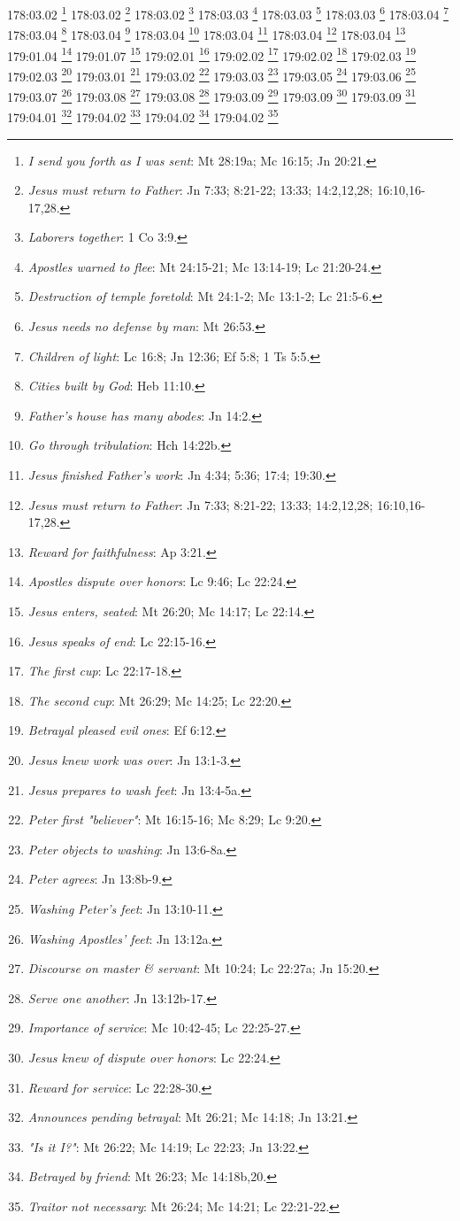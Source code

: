 178:03.02 \footnote{\textit{I send you forth as I was sent}: Mt 28:19a; Mc 16:15; Jn 20:21.}
178:03.02 \footnote{\textit{Jesus must return to Father}: Jn 7:33; 8:21-22; 13:33; 14:2,12,28; 16:10,16-17,28.}
178:03.02 \footnote{\textit{Laborers together}: 1 Co 3:9.}
178:03.03 \footnote{\textit{Apostles warned to flee}: Mt 24:15-21; Mc 13:14-19; Lc 21:20-24.}
178:03.03 \footnote{\textit{Destruction of temple foretold}: Mt 24:1-2; Mc 13:1-2; Lc 21:5-6.}
178:03.03 \footnote{\textit{Jesus needs no defense by man}: Mt 26:53.}
178:03.04 \footnote{\textit{Children of light}: Lc 16:8; Jn 12:36; Ef 5:8; 1 Ts 5:5.}
178:03.04 \footnote{\textit{Cities built by God}: Heb 11:10.}
178:03.04 \footnote{\textit{Father's house has many abodes}: Jn 14:2.}
178:03.04 \footnote{\textit{Go through tribulation}: Hch 14:22b.}
178:03.04 \footnote{\textit{Jesus finished Father's work}: Jn 4:34; 5:36; 17:4; 19:30.}
178:03.04 \footnote{\textit{Jesus must return to Father}: Jn 7:33; 8:21-22; 13:33; 14:2,12,28; 16:10,16-17,28.}
178:03.04 \footnote{\textit{Reward for faithfulness}: Ap 3:21.}
179:01.04 \footnote{\textit{Apostles dispute over honors}: Lc 9:46; Lc 22:24.}
179:01.07 \footnote{\textit{Jesus enters, seated}: Mt 26:20; Mc 14:17; Lc 22:14.}
179:02.01 \footnote{\textit{Jesus speaks of end}: Lc 22:15-16.}
179:02.02 \footnote{\textit{The first cup}: Lc 22:17-18.}
179:02.02 \footnote{\textit{The second cup}: Mt 26:29; Mc 14:25; Lc 22:20.}
179:02.03 \footnote{\textit{Betrayal pleased evil ones}: Ef 6:12.}
179:02.03 \footnote{\textit{Jesus knew work was over}: Jn 13:1-3.}
179:03.01 \footnote{\textit{Jesus prepares to wash feet}: Jn 13:4-5a.}
179:03.02 \footnote{\textit{Peter first "believer"}: Mt 16:15-16; Mc 8:29; Lc 9:20.}
179:03.03 \footnote{\textit{Peter objects to washing}: Jn 13:6-8a.}
179:03.05 \footnote{\textit{Peter agrees}: Jn 13:8b-9.}
179:03.06 \footnote{\textit{Washing Peter's feet}: Jn 13:10-11.}
179:03.07 \footnote{\textit{Washing Apostles' feet}: Jn 13:12a.}
179:03.08 \footnote{\textit{Discourse on master & servant}: Mt 10:24; Lc 22:27a; Jn 15:20.}
179:03.08 \footnote{\textit{Serve one another}: Jn 13:12b-17.}
179:03.09 \footnote{\textit{Importance of service}: Mc 10:42-45; Lc 22:25-27.}
179:03.09 \footnote{\textit{Jesus knew of dispute over honors}: Lc 22:24.}
179:03.09 \footnote{\textit{Reward for service}: Lc 22:28-30.}
179:04.01 \footnote{\textit{Announces pending betrayal}: Mt 26:21; Mc 14:18; Jn 13:21.}
179:04.02 \footnote{\textit{"Is it I?"}: Mt 26:22; Mc 14:19; Lc 22:23; Jn 13:22.}
179:04.02 \footnote{\textit{Betrayed by friend}: Mt 26:23; Mc 14:18b,20.}
179:04.02 \footnote{\textit{Traitor not necessary}: Mt 26:24; Mc 14:21; Lc 22:21-22.}
